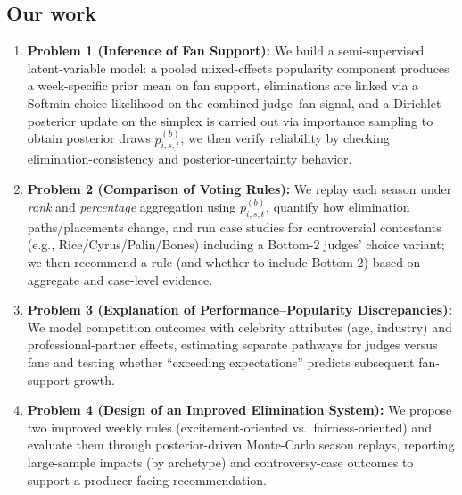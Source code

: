 \documentclass[12pt]{article}
\begin{document}
\subsection{Our work}
\begin{enumerate}
	
	\item \textbf{Problem 1 (Inference of Fan Support): }
	We build a semi-supervised latent-variable model: a pooled mixed-effects popularity component
	produces a week-specific prior mean on fan support, eliminations are linked via a Softmin
	choice likelihood on the combined judge--fan signal, and a Dirichlet posterior update on the
	simplex is carried out via importance sampling to obtain posterior draws $p^{(b)}_{i,s,t}$; we
	then verify reliability by checking elimination-consistency and posterior-uncertainty behavior.
	
	
	
	\item \textbf{Problem 2 (Comparison of Voting Rules): }
	We replay each season under \textit{rank} and \textit{percentage} aggregation using $p^{(b)}_{i,s,t}$,
	quantify how elimination paths/placements change, and run case studies for controversial contestants
	(e.g., Rice/Cyrus/Palin/Bones) including a Bottom-2 judges' choice variant; we then recommend a rule
	(and whether to include Bottom-2) based on aggregate and case-level evidence.
	
	\item \textbf{Problem 3 (Explanation of Performance–Popularity Discrepancies): }
	We model competition outcomes with celebrity attributes (age, industry) and professional-partner
	effects, estimating separate pathways for judges versus fans and testing whether ``exceeding
	expectations'' predicts subsequent fan-support growth.
	
	\item \textbf{Problem 4 (Design of an Improved Elimination System): }
	We propose two improved weekly rules (excitement-oriented vs.\ fairness-oriented) and evaluate them
	through posterior-driven Monte-Carlo season replays, reporting large-sample impacts (by archetype)
	and controversy-case outcomes to support a producer-facing recommendation.
	
\end{enumerate}






\end{document}
